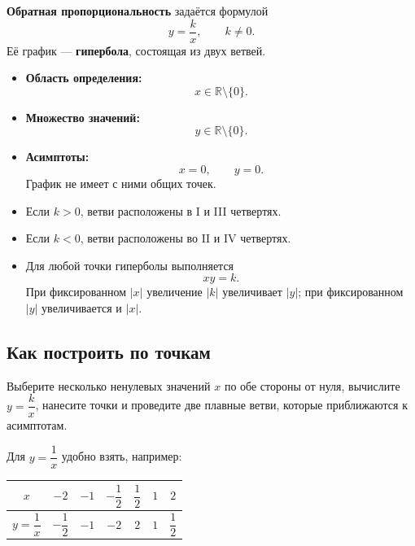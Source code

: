 \documentclass[a4paper,12pt]{article}
\newcommand{\term}[1]{\textcolor{darkaccent}{\textbf{#1}}}
\newcommand{\R}{\mathbb{R}}
\begin{document}
\term{Обратная пропорциональность} задаётся формулой
\[
y=\frac{k}{x},
\qquad k\ne0.
\]
Её график --- \term{гипербола}, состоящая из двух ветвей.

\begin{itemize}
    \item \textbf{Область определения:}
    \[
    x\in\R\setminus\{0\}.
    \]

    \item \textbf{Множество значений:}
    \[
    y\in\R\setminus\{0\}.
    \]

    \item \textbf{Асимптоты:}
    \[
    x=0,
    \qquad
    y=0.
    \]
    График не имеет с ними общих точек.

    \item Если $k>0$, ветви расположены в I и III четвертях.

    \item Если $k<0$, ветви расположены во II и IV четвертях.

    \item Для любой точки гиперболы выполняется
    \[
    xy=k.
    \]
    При фиксированном $|x|$ увеличение $|k|$ увеличивает $|y|$;
    при фиксированном $|y|$ увеличивается и $|x|$.
\end{itemize}

\subsection*{Как построить по точкам}

Выберите несколько ненулевых значений $x$ по обе стороны от нуля,
вычислите $y=\dfrac{k}{x}$, нанесите точки и проведите две плавные ветви,
которые приближаются к асимптотам.

Для $y=\dfrac1x$ удобно взять, например:

\begin{table}[ht]
\centering
\renewcommand{\arraystretch}{1.25}
\begin{tabular}{@{}ccccccc@{}}
\toprule
$x$ & $-2$ & $-1$ & $-\dfrac12$ & $\dfrac12$ & $1$ & $2$ \\
\midrule
$y=\dfrac1x$ & $-\dfrac12$ & $-1$ & $-2$ & $2$ & $1$ & $\dfrac12$ \\
\bottomrule
\end{tabular}
\end{table}
\end{document}
